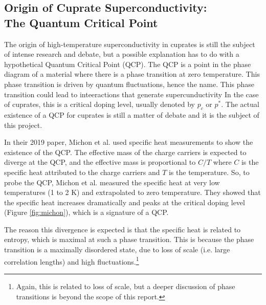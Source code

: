 \subsection{Origin of Cuprate Superconductivity:\\The Quantum Critical Point}
The origin of high-temperature superconductivity in cuprates is still the subject of intense
research and debate, but a possible explanation has to do with a hypothetical Quantum Critical
Point (QCP). The QCP is a point in the phase diagram of a material where there is a phase transition
at zero temperature. This phase transition is driven by quantum fluctuations, hence the name. This
phase transition could lead to inteeractions that generate supercunductivity In the case of
cuprates, this is a critical doping level, usually denoted by $p_c$ or $p^*$. The actual existence
of a QCP for cuprates is still a matter of debate and it is the subject of this project.

In their 2019 paper, Michon et al.\cite{michon2019} used specific heat measurements to
show the existence of the QCP. The effective mass of the charge carriers is expected to diverge at
the QCP, and the effective mass is proportional to $C/T$ where $C$ is the specific heat attributed
to the charge carriers and $T$ is the temperature. So, to probe the QCP, Michon et al. measured
the specific heat at very low temperatures (1 to 2 K) and extrapolated to zero temperature. They
showed that the specific heat increases dramatically and peaks at the critical doping level
(Figure \ref{fig:michon}), which is a signature of a QCP.

The reason this divergence is expected is that the specific heat is related
to entropy, which is maximal at such a phase transition. This is because the phase transition is a
maximally disordered state, due to loss of scale (i.e. large correlation lengths) and high
fluctuations.\footnote{Again, this is related to loss of scale, but a deeper discussion of phase
transitions is beyond the scope of this report.}